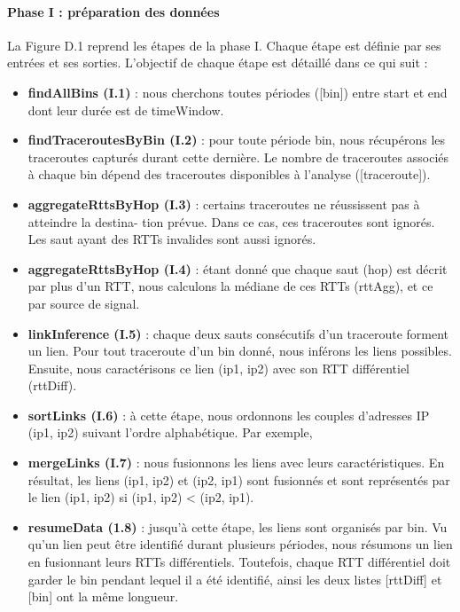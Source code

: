  \paragraph{Phase I : préparation des données}
 La Figure D.1 reprend les étapes de la phase I. Chaque étape est définie par ses entrées et
 ses sorties. L’objectif de chaque étape est détaillé dans ce qui suit :
 \begin{itemize}
 	\item \textbf{findAllBins (I.1)} : nous cherchons toutes périodes {\color{gray}([bin])} entre start et end dont leur
 durée est de timeWindow.
 \item \textbf{findTraceroutesByBin (I.2)} : pour toute période  {\color{gray}bin}, nous récupérons les traceroutes
 capturés durant cette dernière. Le nombre de traceroutes associés à chaque bin dépend
 des traceroutes disponibles à l’analyse  {\color{gray}([traceroute])}.
 \item \textbf{aggregateRttsByHop (I.3)} : certains traceroutes ne réussissent pas à atteindre la destina-
 tion prévue. Dans ce cas, ces traceroutes sont ignorés. Les saut ayant des RTTs invalides
 sont aussi ignorés.
 \item \textbf{aggregateRttsByHop (I.4)} : étant donné que chaque saut  {\color{gray}(hop)} est décrit par plus d’un
 RTT, nous calculons la médiane de ces RTTs  {\color{gray}(rttAgg)}, et ce par source de signal.
 \item \textbf{linkInference (I.5)} : chaque deux sauts consécutifs d’un traceroute forment un lien. Pour
 tout traceroute d’un bin donné, nous inférons les liens possibles. Ensuite, nous caractérisons ce lien  {\color{gray}(ip1, ip2)} avec son RTT différentiel  {\color{gray}(rttDiff)}.
\item \textbf{sortLinks (I.6) }: à cette étape, nous ordonnons les couples d'adresses IP  {\color{gray}(ip1, ip2)} suivant l'ordre alphabétique. Par exemple, 
 
 \item \textbf{mergeLinks (I.7)} : nous fusionnons les liens avec leurs caractéristiques. En résultat, les
 liens (ip1, ip2) et (ip2, ip1) sont fusionnés et sont représentés par le lien (ip1, ip2) si (ip1,
 ip2) < (ip2, ip1).
 \item \textbf{resumeData (1.8)} : jusqu’à cette étape, les liens sont organisés par bin. Vu qu’un lien
 peut être identifié durant plusieurs périodes, nous résumons un lien en fusionnant leurs
 RTTs différentiels. Toutefois, chaque RTT différentiel doit garder le bin pendant lequel il
 a été identifié, ainsi les deux listes  {\color{gray}[rttDiff]} et  {\color{gray}[bin]} ont la même longueur.
 
 
\end{itemize}

